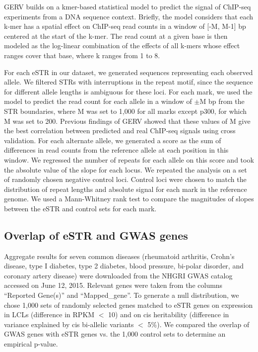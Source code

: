 GERV builds on a kmer-based statistical model to predict the signal of ChIP-seq experiments from a DNA sequence context. Briefly, the model considers that each k-mer has a spatial effect on ChIP-seq read counts in a window of [-M, M-1] bp centered at the start of the k-mer. The read count at a given base is then modeled as the log-linear combination of the effects of all k-mers whose effect ranges cover that base, where k ranges from 1 to 8. 

For each eSTR in our dataset, we generated sequences representing each observed allele. We filtered STRs with interruptions in the repeat motif, since the sequence for different allele lengths is ambiguous for these loci. For each mark, we used the model to predict the read count for each allele in a window of $\pm$M bp from the STR boundaries, where M was set to 1,000 for all marks except p300, for which M was set to 200. Previous findings of GERV showed that these values of M give the best correlation between predicted and real ChIP-seq signals using cross validation. For each alternate allele, we generated a score as the sum of differences in read counts from the reference allele at each position in this window. We regressed the number of repeats for each allele on this score and took the absolute value of the slope for each locus. We repeated the analysis on a set of randomly chosen negative control loci. Control loci were chosen to match the distribution of repeat lengths and absolute signal for each mark in the reference genome. We used a Mann-Whitney rank test to compare the magnitudes of slopes between the eSTR and control sets for each mark.

\subsection{Overlap of eSTR and GWAS genes}
Aggregate results for seven common diseases (rheumatoid arthritis, Crohn's disease, type I diabetes, type 2 diabetes, blood pressure, bi-polar disorder, and coronary artery disease) were downloaded from the NHGRI GWAS catalog accessed on June 12, 2015. Relevant genes were taken from the columns “Reported Gene(s)” and “Mapped\_gene”. To generate a null distribution, we chose 1,000 sets of randomly selected genes matched to eSTR genes on expression in LCLs (difference in RPKM $<$ 10) and on cis heritability (difference in variance explained by cis bi-allelic variants $<$ 5\%). We compared the overlap of GWAS genes with eSTR genes vs. the 1,000 control sets to determine an empirical p-value.

